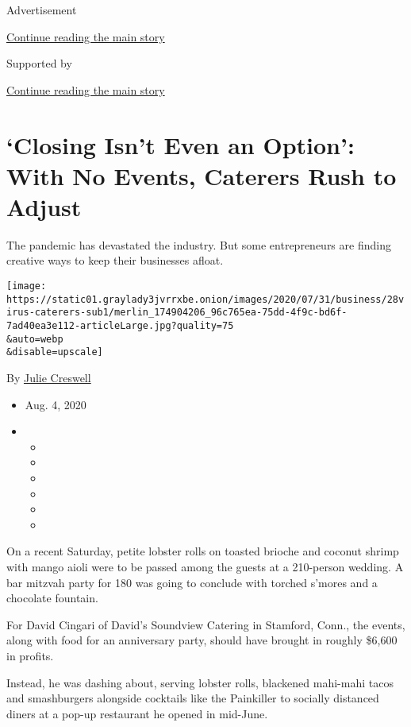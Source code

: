 Advertisement

\protect\hyperlink{after-top}{Continue reading the main story}

Supported by

\protect\hyperlink{after-sponsor}{Continue reading the main story}

\hypertarget{closing-isnt-even-an-option-with-no-events-caterers-rush-to-adjust}{%
\section{`Closing Isn't Even an Option': With No Events, Caterers Rush
to
Adjust}\label{closing-isnt-even-an-option-with-no-events-caterers-rush-to-adjust}}

The pandemic has devastated the industry. But some entrepreneurs are
finding creative ways to keep their businesses afloat.

\texttt{[image: https://static01.graylady3jvrrxbe.onion/images/2020/07/31/business/28virus-caterers-sub1/merlin\_174904206\_96c765ea-75dd-4f9c-bd6f-7ad40ea3e112-articleLarge.jpg?quality=75\\\&auto=webp\\\&disable=upscale]}

By \href{https://www.nytimes3xbfgragh.onion/by/julie-creswell}{Julie
Creswell}

\begin{itemize}
\item
  Aug. 4, 2020
\item
  \begin{itemize}
  \item
  \item
  \item
  \item
  \item
  \item
  \end{itemize}
\end{itemize}

On a recent Saturday, petite lobster rolls on toasted brioche and
coconut shrimp with mango aioli were to be passed among the guests at a
210-person wedding. A bar mitzvah party for 180 was going to conclude
with torched s'mores and a chocolate fountain.

For David Cingari of David's Soundview Catering in Stamford, Conn., the
events, along with food for an anniversary party, should have brought in
roughly \$6,600 in profits.

Instead, he was dashing about, serving lobster rolls, blackened
mahi-mahi tacos and smashburgers alongside cocktails like the Painkiller
to socially distanced diners at a pop-up restaurant he opened in
mid-June.

